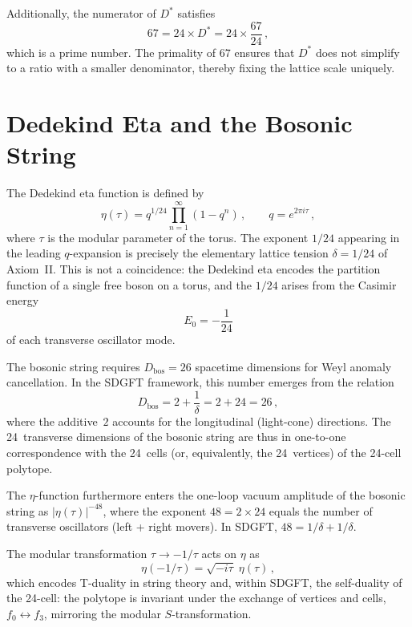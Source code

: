 \documentclass[amsmath,amssymb,aps,prd,twocolumn,superscriptaddress,nofootinbib]{revtex4-2}
\begin{document}
Additionally, the numerator of $D^*$ satisfies
\begin{equation}
  67 = 24\!\times\! D^* = 24 \times \frac{67}{24}\,,
\end{equation}
which is a prime number.  The primality of $67$ ensures that $D^*$ does not
simplify to a ratio with a smaller denominator, thereby fixing the lattice
scale uniquely.

\section{Dedekind Eta and the Bosonic String}\label{sec:dedekind}

The Dedekind eta function is defined by
\begin{equation}\label{eq:eta}
  \eta(\tau) = q^{1/24}\prod_{n=1}^{\infty}(1-q^n)\,,
  \qquad q = e^{2\pi i\tau}\,,
\end{equation}
where $\tau$ is the modular parameter of the torus.  The exponent $1/24$
appearing in the leading $q$-expansion is precisely the elementary lattice
tension $\delta = 1/24$ of Axiom~II.  This is not a coincidence: the Dedekind
eta encodes the partition function of a single free boson on a torus, and the
$1/24$ arises from the Casimir energy
\begin{equation}\label{eq:casimir}
  E_0 = -\frac{1}{24}
\end{equation}
of each transverse oscillator mode.

The bosonic string requires $D_{\text{bos}} = 26$ spacetime dimensions for
Weyl anomaly cancellation.  In the SDGFT framework, this number emerges from
the relation
\begin{equation}\label{eq:dbos}
  D_{\text{bos}} = 2 + \frac{1}{\delta} = 2 + 24 = 26\,,
\end{equation}
where the additive~$2$ accounts for the longitudinal (light-cone) directions.
The 24~transverse dimensions of the bosonic string are thus in one-to-one
correspondence with the 24~cells (or, equivalently, the 24~vertices) of the
24-cell polytope.

The $\eta$-function furthermore enters the one-loop vacuum amplitude of the
bosonic string as $|\eta(\tau)|^{-48}$, where the exponent $48 = 2 \times 24$
equals the number of transverse oscillators (left + right movers).  In SDGFT,
$48 = 1/\delta + 1/\delta$.

The modular transformation $\tau \to -1/\tau$ acts on $\eta$ as
\begin{equation}\label{eq:modular}
  \eta(-1/\tau) = \sqrt{-i\tau}\;\eta(\tau)\,,
\end{equation}
which encodes T-duality in string theory and, within SDGFT, the self-duality of
the 24-cell: the polytope is invariant under the exchange of vertices and cells,
$f_0 \leftrightarrow f_3$, mirroring the modular $S$-transformation.
\end{document}
